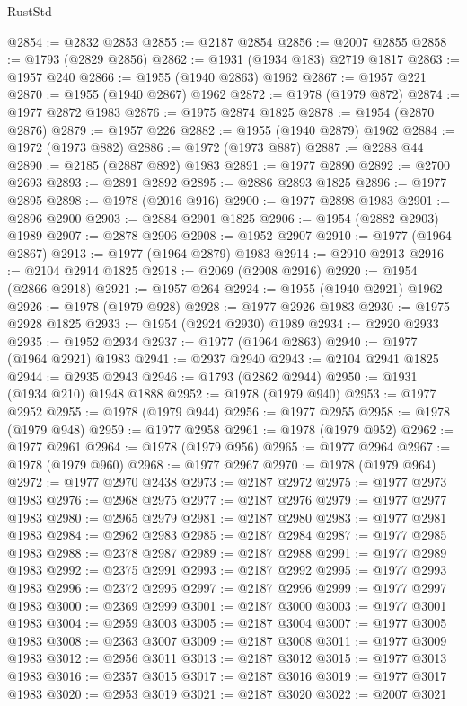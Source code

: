\begin{lexlean}{RustStd}
\begin{coremodule}
@2854 := @2832 @2853
@2855 := @2187 @2854
@2856 := @2007 @2855
@2858 := @1793 (@2829 @2856)
@2862 := @1931 (@1934 @183) @2719 @1817
@2863 := @1957 @240
@2866 := @1955 (@1940 @2863) @1962
@2867 := @1957 @221
@2870 := @1955 (@1940 @2867) @1962
@2872 := @1978 (@1979 @872)
@2874 := @1977 @2872 @1983
@2876 := @1975 @2874 @1825
@2878 := @1954 (@2870 @2876)
@2879 := @1957 @226
@2882 := @1955 (@1940 @2879) @1962
@2884 := @1972 (@1973 @882)
@2886 := @1972 (@1973 @887)
@2887 := @2288 @44
@2890 := @2185 (@2887 @892) @1983
@2891 := @1977 @2890
@2892 := @2700 @2693
@2893 := @2891 @2892
@2895 := @2886 @2893 @1825
@2896 := @1977 @2895
@2898 := @1978 (@2016 @916)
@2900 := @1977 @2898 @1983
@2901 := @2896 @2900
@2903 := @2884 @2901 @1825
@2906 := @1954 (@2882 @2903) @1989
@2907 := @2878 @2906
@2908 := @1952 @2907
@2910 := @1977 (@1964 @2867)
@2913 := @1977 (@1964 @2879) @1983
@2914 := @2910 @2913
@2916 := @2104 @2914 @1825
@2918 := @2069 (@2908 @2916)
@2920 := @1954 (@2866 @2918)
@2921 := @1957 @264
@2924 := @1955 (@1940 @2921) @1962
@2926 := @1978 (@1979 @928)
@2928 := @1977 @2926 @1983
@2930 := @1975 @2928 @1825
@2933 := @1954 (@2924 @2930) @1989
@2934 := @2920 @2933
@2935 := @1952 @2934
@2937 := @1977 (@1964 @2863)
@2940 := @1977 (@1964 @2921) @1983
@2941 := @2937 @2940
@2943 := @2104 @2941 @1825
@2944 := @2935 @2943
@2946 := @1793 (@2862 @2944)
@2950 := @1931 (@1934 @210) @1948 @1888
@2952 := @1978 (@1979 @940)
@2953 := @1977 @2952
@2955 := @1978 (@1979 @944)
@2956 := @1977 @2955
@2958 := @1978 (@1979 @948)
@2959 := @1977 @2958
@2961 := @1978 (@1979 @952)
@2962 := @1977 @2961
@2964 := @1978 (@1979 @956)
@2965 := @1977 @2964
@2967 := @1978 (@1979 @960)
@2968 := @1977 @2967
@2970 := @1978 (@1979 @964)
@2972 := @1977 @2970 @2438
@2973 := @2187 @2972
@2975 := @1977 @2973 @1983
@2976 := @2968 @2975
@2977 := @2187 @2976
@2979 := @1977 @2977 @1983
@2980 := @2965 @2979
@2981 := @2187 @2980
@2983 := @1977 @2981 @1983
@2984 := @2962 @2983
@2985 := @2187 @2984
@2987 := @1977 @2985 @1983
@2988 := @2378 @2987
@2989 := @2187 @2988
@2991 := @1977 @2989 @1983
@2992 := @2375 @2991
@2993 := @2187 @2992
@2995 := @1977 @2993 @1983
@2996 := @2372 @2995
@2997 := @2187 @2996
@2999 := @1977 @2997 @1983
@3000 := @2369 @2999
@3001 := @2187 @3000
@3003 := @1977 @3001 @1983
@3004 := @2959 @3003
@3005 := @2187 @3004
@3007 := @1977 @3005 @1983
@3008 := @2363 @3007
@3009 := @2187 @3008
@3011 := @1977 @3009 @1983
@3012 := @2956 @3011
@3013 := @2187 @3012
@3015 := @1977 @3013 @1983
@3016 := @2357 @3015
@3017 := @2187 @3016
@3019 := @1977 @3017 @1983
@3020 := @2953 @3019
@3021 := @2187 @3020
@3022 := @2007 @3021

\end{coremodule}
\end{lexlean}
